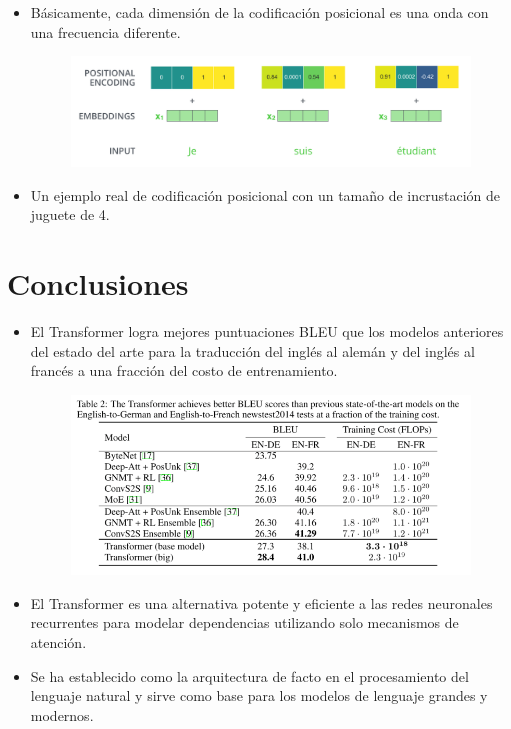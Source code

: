 \begin{itemize}
\item Básicamente, cada dimensión de la codificación posicional es una onda con una frecuencia diferente.

\begin{figure}[h]
  \centering
  \includegraphics[scale=0.25]{pics/transformer_positional_encoding_example.png}
\end{figure}

\item Un ejemplo real de codificación posicional con un tamaño de incrustación de juguete de 4.

\end{itemize}

\section{Conclusiones}

\begin{itemize}
\item El Transformer logra mejores puntuaciones BLEU que los modelos anteriores del estado del arte para la traducción del inglés al alemán y del inglés al francés a una fracción del costo de entrenamiento.

\begin{figure}[h]
  \centering
  \includegraphics[scale=0.29]{pics/transformerresults.png}
\end{figure}

\item El Transformer es una alternativa potente y eficiente a las redes neuronales recurrentes para modelar dependencias utilizando solo mecanismos de atención.

\item Se ha establecido como la arquitectura de facto en el procesamiento del lenguaje natural y sirve como base para los modelos de lenguaje grandes y modernos.

\end{itemize}
